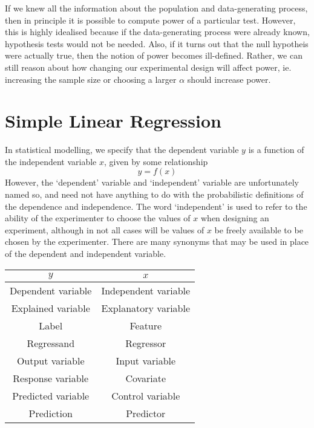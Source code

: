 \documentclass[11pt]{report} %
\begin{document}
If we knew all the information about the population and data-generating process, then in principle it is possible to compute power of a particular test. However, this is highly idealised because if the data-generating process were already known, hypothesis tests would not be needed. Also, if it turns out that the null hypotheis were actually true, then the notion of power becomes ill-defined. Rather, we can still reason about how changing our experimental design will affect power, ie. increasing the sample size or choosing a larger $\alpha$ should increase power.

\section{Simple Linear Regression}

In statistical modelling, we specify that the dependent variable $y$ is a function of the independent variable $x$, given by some relationship
\begin{equation}
y = f\left(x\right)
\end{equation}
However, the `dependent' variable and `independent' variable are unfortunately named so, and need not have anything to do with the probabilistic definitions of the dependence and independence. The word `independent' is used to refer to the ability of the experimenter to choose the values of $x$ when designing an experiment, although in not all cases will be values of $x$ be freely available to be chosen by the experimenter. There are many synonyms that may be used in place of the dependent and independent variable.

\begin{table}[H]\centering
\begin{tabular}{|c|c|}
\hline 
$y$ & $x$ \\
\hline 
\hline 
Dependent variable & Independent variable \\
Explained variable & Explanatory variable \\
Label & Feature \\
Regressand & Regressor \\
Output variable & Input variable \\
Response variable & Covariate \\
Predicted variable & Control variable \\
Prediction & Predictor \\
\hline
\end{tabular}
\end{table}
\end{document}
